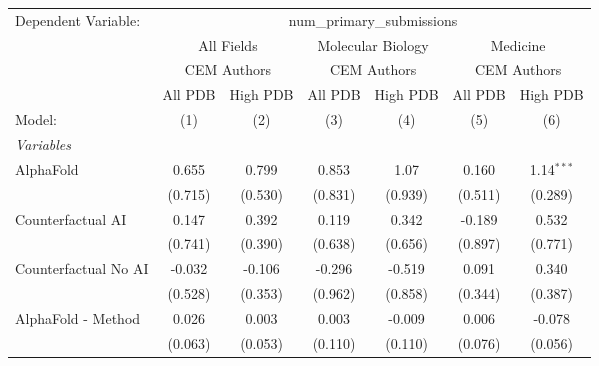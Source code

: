\begingroup
\centering
\begin{tabular}{lcccccc}
   \tabularnewline \midrule \midrule
   Dependent Variable: & \multicolumn{6}{c}{num\_primary\_submissions}\\
 & \multicolumn{2}{c}{All Fields} & \multicolumn{2}{c}{Molecular Biology} & \multicolumn{2}{c}{Medicine} \\
\cmidrule(lr){2-3} \cmidrule(lr){4-5} \cmidrule(lr){6-7}
 & \multicolumn{2}{c}{CEM Authors} & \multicolumn{2}{c}{CEM Authors} & \multicolumn{2}{c}{CEM Authors} \\
\cmidrule(lr){2-3} \cmidrule(lr){4-5} \cmidrule(lr){6-7}
 & \multicolumn{1}{c}{All PDB} & \multicolumn{1}{c}{High PDB} & \multicolumn{1}{c}{All PDB} & \multicolumn{1}{c}{High PDB} & \multicolumn{1}{c}{All PDB} & \multicolumn{1}{c}{High PDB} \\
\cmidrule(lr){2-2} \cmidrule(lr){3-3} \cmidrule(lr){4-4} \cmidrule(lr){5-5} \cmidrule(lr){6-6} \cmidrule(lr){7-7}
   Model:                                                     & (1)     & (2)            & (3)     & (4)     & (5)     & (6)\\  
   \midrule
   \emph{Variables}\\
   AlphaFold                                                  & 0.655   & 0.799          & 0.853   & 1.07    & 0.160   & 1.14$^{***}$\\   
                                                              & (0.715) & (0.530)        & (0.831) & (0.939) & (0.511) & (0.289)\\   
   Counterfactual AI                                          & 0.147   & 0.392          & 0.119   & 0.342   & -0.189  & 0.532\\   
                                                              & (0.741) & (0.390)        & (0.638) & (0.656) & (0.897) & (0.771)\\   
   Counterfactual No AI                                       & -0.032  & -0.106         & -0.296  & -0.519  & 0.091   & 0.340\\   
                                                              & (0.528) & (0.353)        & (0.962) & (0.858) & (0.344) & (0.387)\\   
   AlphaFold - Method                                         & 0.026   & 0.003          & 0.003   & -0.009  & 0.006   & -0.078\\   
                                                              & (0.063) & (0.053)        & (0.110) & (0.110) & (0.076) & (0.056)\\   

\end{tabular}
